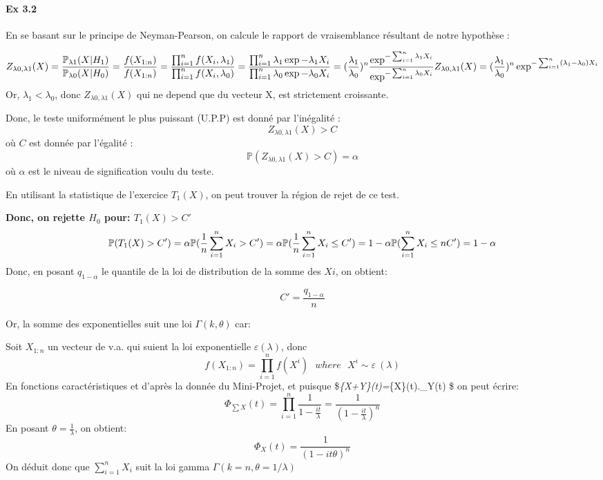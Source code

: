 \documentclass[11pt]{article}
\begin{document}
\paragraph{Ex 3.2}\label{ex-3.2}

    En se basant sur le principe de Neyman-Pearson, on calcule le rapport de
vraisemblance résultant de notre hypothèse :

\[
   Z_{\lambda 0,\lambda 1}(X) = \frac{\mathbb{P}_{\lambda1}(X|H_1)}{\mathbb{P}_{\lambda0}(X|H_0)}
                              = \frac{f(X_{1:n})}{f(X_{1:n})}\\
                              = \frac{\prod_{i=1}^n f(X_i, \lambda_1)}{\prod_{i=1}^n f(X_i, \lambda_0)}\\
                              = \frac{\prod_{i=1}^n \lambda_1\exp{-\lambda_1 X_i}}{\prod_{i=1}^n \lambda_0\exp{-\lambda_0 X_i}}\\
                              =(\frac{\lambda_1}{\lambda_0})^n\frac{\exp^{-\sum_{i=1}^n \lambda_1 X_i}}{\exp^{-\sum_{i=1}^n \lambda_0 X_i}}\\
Z_{\lambda 0,\lambda 1}(X) = (\frac{\lambda_1}{\lambda_0})^n \exp^{-\sum_{i=1}^n (\lambda_1-\lambda_0) X_i}
\] Or, \(\lambda_1 < \lambda_0\), donc \(Z_{\lambda 0,\lambda 1}(X)\)
qui ne depend que du vecteur X, est strictement croissante.

Donc, le teste uniformément le plus puissant (U.P.P) est donné par
l'inégalité : \[ Z_{\lambda 0,\lambda 1}(X) > C \] où \(C\) est donnée
par l'égalité : \[ \mathbb{P}(Z_{\lambda 0,\lambda 1}(X) > C) = \alpha\]
où \(\alpha\) est le niveau de signification voulu du teste.

En utilisant la statistique de l'exercice \(T_1(X)\), on peut trouver la
région de rejet de ce test.

\textbf{Donc, on rejette \(H_0\) pour: \(T_1(X) > C'\)}
\[ \mathbb{P}( T_1(X) > C') = \alpha\\ \mathbb{P}( \frac{1}{n}\sum^n_{i=1}X_i > C') = \alpha\\
 \mathbb{P}( \frac{1}{n}\sum^n_{i=1}X_i \leq C') = 1 - \alpha\\
 \mathbb{P}( \sum^n_{i=1}X_i \leq nC') = 1 - \alpha
\] Donc, en posant \(q_{1-\alpha}\) le quantile de la loi de
distribution de la somme des \(Xi\), on obtient:

\[C' = \frac{q_{1-\alpha}}{n}\]

Or, la somme des exponentielles suit une loi \(\Gamma(k,\theta)\) car:

Soit \(X_{1:n}\) un vecteur de v.a. qui suient la loi exponentielle
\(\varepsilon(\lambda)\), donc
\[f(X_{1:n}) = \prod_{i=1}^n f(X^i)\ \ \ where\ \ \  X^i \sim \varepsilon\ (\lambda)\]
En fonctions caractéristiques et d'après la donnée du Mini-Projet, et
puisque \$\Phi\emph{\{X+Y\}(t)=\Phi}\{X\}(t).\Phi\_Y(t) \$ on peut
écrire:
\[ \Phi_{\sum X}(t) = \prod_{i=1}^n \frac{1}{1-\frac{it}{\lambda}} = \frac{1}{(1-\frac{it}{\lambda})^n}\]
En posant \(\theta = \frac{1}{\lambda}\), on obtient:
\[\Phi_X(t)= \frac{1}{(1-it\theta)^n}\] On déduit donc que
\(\sum^n_{i=1} X_i\) suit la loi gamma
\(\Gamma(k= n,\theta = 1/\lambda)\)
\end{document}
